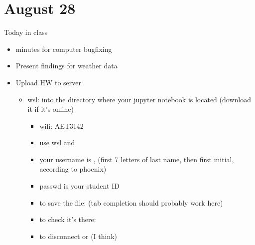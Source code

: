 \documentclass[letterpaper,10pt,english]{jupyterBook}
\begin{document}
\sphinxstepscope


\chapter{August 28}
\label{\detokenize{lessons/cw03:august-28}}\label{\detokenize{lessons/cw03::doc}}
\sphinxAtStartPar
Today in class
\begin{itemize}
\item {} 
 minutes for computer bugfixing

\item {} 
\sphinxAtStartPar
Present findings for weather data

\item {} 
\sphinxAtStartPar
Upload HW to server
\begin{itemize}
\item {} 
\sphinxAtStartPar
wsl:  into the  directory where your jupyter notebook is located (download it if it’s online)
\begin{itemize}
\item {} 
\sphinxAtStartPar
wifi: AET\sphinxhyphen{}3142

\item {} 
\sphinxAtStartPar
use wsl  and 

\item {} 
\sphinxAtStartPar
your username is , (first 7 letters of last name, then first initial, according to phoenix)

\item {} 
\sphinxAtStartPar
passwd is your student ID

\item {} 
\sphinxAtStartPar
to save the file:  (tab completion should probably work here)

\item {} 
\sphinxAtStartPar
to check it’s there: 

\item {} 
\sphinxAtStartPar
to disconnect  or (I think) 

\end{itemize}

\end{itemize}


\end{itemize}
\end{document}
